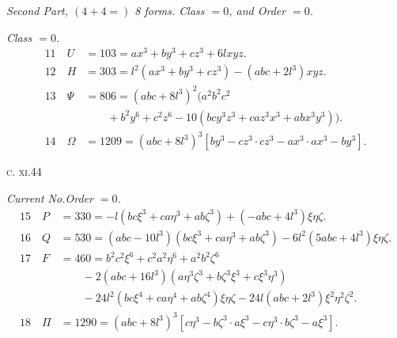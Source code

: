 \documentclass[11pt,a4paper]{article}
\begin{document}
\noindent
\textit{Second Part, $(4+4=)$ 8 forms. Class $=0$, and Order $=0$.}\par\medskip
\noindent\textit{Class $=0$.}
\begin{align*}
  11\quad U &= 103 = ax^{3}+by^{3}+cz^{3}+6lxyz.\\
  12\quad H &= 303 = l^{2}(ax^{3}+by^{3}+cz^{3})-(abc+2l^{3})xyz.\\
  13\quad \Psi &= 806 = (abc+8l^{3})^{2}(a^{2}b^{2}c^{2}\\
   &\qquad +b^{2}y^{6}+c^{2}z^{6}-10(bcy^{3}z^{3}+caz^{3}x^{3}+abx^{3}y^{3})).\\
  14\quad \Omega &= 1209 = (abc+8l^{3})^{3}[by^{3}-cz^{3}\cdot cz^{3}-ax^{3}\cdot ax^{3}-by^{3}].
\end{align*}

\hfill\textsc{c. xi.}\hfill 44

\newpage
\noindent\textit{Current No.}\quad\textit{Order $=0$.}
\begin{align*}
  15\quad P &= 330 = -l(bc\xi^{3}+ca\eta^{3}+ab\zeta^{3})+(-abc+4l^{3})\xi\eta\zeta.\\
  16\quad Q &= 530 = (abc-10l^{3})(bc\xi^{3}+ca\eta^{3}+ab\zeta^{3})-6l^{2}(5abc+4l^{3})\xi\eta\zeta.\\
  17\quad F &= 460 = b^{2}c^{2}\xi^{6}+c^{2}a^{2}\eta^{6}+a^{2}b^{2}\zeta^{6}\\
   &\qquad -2(abc+16l^{3})(a\eta^{3}\zeta^{3}+b\zeta^{3}\xi^{3}+c\xi^{3}\eta^{3})\\
   &\qquad -24l^{2}(bc\xi^{4}+ca\eta^{4}+ab\zeta^{4})\xi\eta\zeta-24l(abc+2l^{3})\xi^{2}\eta^{2}\zeta^{2}.\\
  18\quad \Pi &= 1290 = (abc+8l^{3})^{3}[c\eta^{3}-b\zeta^{3}\cdot a\xi^{3}-c\eta^{3}\cdot b\zeta^{3}-a\xi^{3}].
\end{align*}
\end{document}
